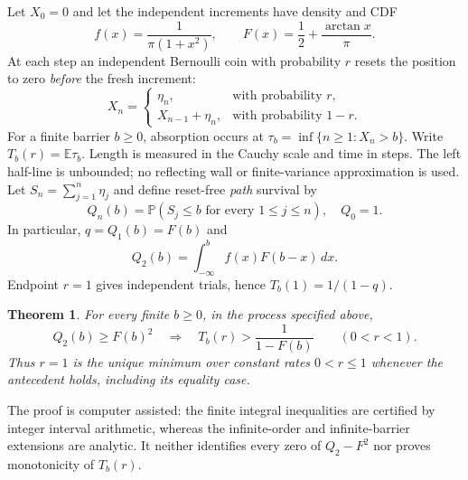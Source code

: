 \documentclass[11pt]{article}
\newtheorem{theorem}{Theorem}
\begin{document}
Let $X_0=0$ and let the independent increments have density and CDF
\begin{equation}
 f(x)=\frac{1}{\pi(1+x^2)},\qquad
 F(x)=\frac12+\frac{\arctan x}{\pi}.
\end{equation}
At each step an independent Bernoulli coin with probability $r$ resets the
position to zero \emph{before} the fresh increment:
\begin{equation}
 X_n=\begin{cases}\eta_n,&\text{with probability }r,\\
 X_{n-1}+\eta_n,&\text{with probability }1-r.
 \end{cases}
\end{equation}
For a finite barrier $b\ge0$, absorption occurs at
$\tau_b=\inf\{n\ge1:X_n>b\}$. Write $T_b(r)=\mathbb E\tau_b$.
Length is measured in the Cauchy scale and time in steps. The left half-line
is unbounded; no reflecting wall or finite-variance approximation is used.
Let $S_n=\sum_{j=1}^n\eta_j$ and define reset-free \emph{path} survival by
\begin{equation}
 Q_n(b)=\mathbb P(S_j\le b\text{ for every }1\le j\le n),\quad Q_0=1.
\end{equation}
In particular, $q=Q_1(b)=F(b)$ and
\begin{equation}\label{eq:q2}
 Q_2(b)=\int_{-\infty}^b f(x)F(b-x)\,dx.
\end{equation}
Endpoint $r=1$ gives independent trials, hence $T_b(1)=1/(1-q)$.

\begin{theorem}\label{thm:main}
For every finite $b\ge0$, in the process specified above,
\begin{equation}
 Q_2(b)\ge F(b)^2\quad\Longrightarrow\quad
 T_b(r)>\frac{1}{1-F(b)}\qquad(0<r<1).
\end{equation}
Thus $r=1$ is the unique minimum over constant rates $0<r\le1$ whenever
the antecedent holds, including its equality case.
\end{theorem}
The proof is computer assisted: the finite integral inequalities are
certified by integer interval arithmetic, whereas the infinite-order and
infinite-barrier extensions are analytic. It neither identifies every zero
of $Q_2-F^2$ nor proves monotonicity of $T_b(r)$.
\end{document}
